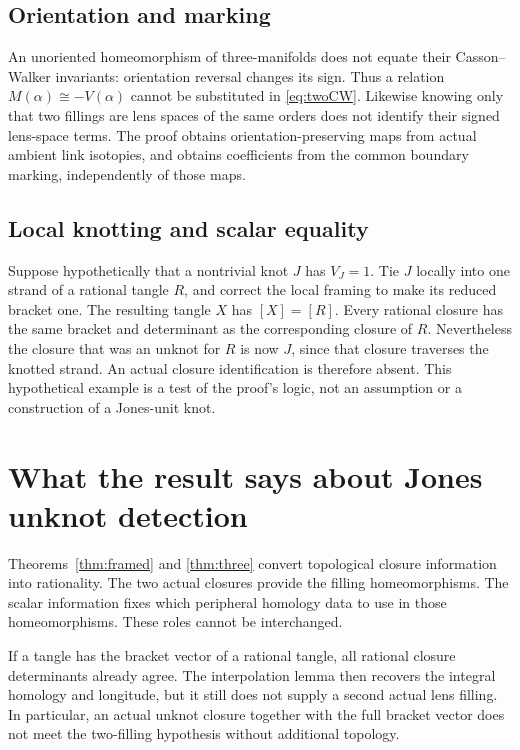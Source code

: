 \documentclass[11pt]{amsart}
\theoremstyle{definition}
\theoremstyle{remark}
\begin{document}
\subsection{Orientation and marking}

An unoriented
homeomorphism of
three-manifolds does
not equate their
Casson--Walker
invariants: orientation
reversal changes its
sign. Thus a relation
\(M(\alpha)\cong
-V(\alpha)\) cannot
be substituted in
\eqref{eq:twoCW}.
Likewise knowing only
that two fillings are
lens spaces of the
same orders does not
identify their signed
lens-space terms.
The proof obtains
orientation-preserving
maps from actual
ambient link isotopies,
and obtains coefficients
from the common
boundary marking,
independently of those
maps.

\subsection{Local knotting and scalar equality}

Suppose hypothetically
that a nontrivial knot
\(J\) has \(V_J=1\).
Tie \(J\) locally into
one strand of a
rational tangle \(R\),
and correct the local
framing to make its
reduced bracket one.
The resulting tangle
\(X\) has \([X]=[R]\).
Every rational closure
has the same bracket
and determinant as
the corresponding
closure of \(R\).
Nevertheless the
closure that was an
unknot for \(R\) is
now \(J\), since that
closure traverses
the knotted strand.
An actual closure
identification is
therefore absent.
This hypothetical
example is a test of
the proof's logic,
not an assumption
or a construction
of a Jones-unit knot.

\section{What the result says about Jones unknot detection}\label{sec:jones}

Theorems~\ref{thm:framed}
and \ref{thm:three}
convert topological
closure information
into rationality.
The two actual
closures provide
the filling
homeomorphisms.
The scalar
information fixes
which peripheral
homology data to
use in those
homeomorphisms.
These roles cannot
be interchanged.

If a tangle has
the bracket vector
of a rational
tangle, all
rational closure
determinants
already agree.
The interpolation
lemma then
recovers the
integral homology
and longitude,
but it still
does not supply
a second actual
lens filling.
In particular,
an actual unknot
closure together
with the full
bracket vector
does not meet
the two-filling
hypothesis without
additional topology.
\end{document}
